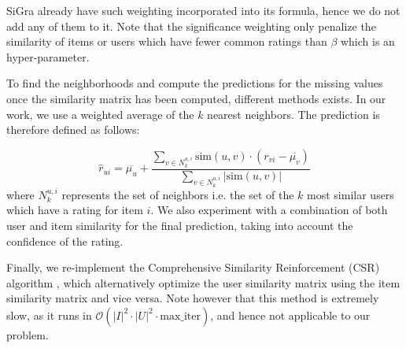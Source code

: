 \documentclass[sigconf]{acmart}
\begin{document}
\vspace*{0.1cm}
\normalsize
\noindent
SiGra already have such weighting incorporated into its formula, hence we do not add any of them to it. 
Note that the significance weighting only penalize the similarity of items or users which have fewer common ratings than $\beta$ which is an hyper-parameter.

To find the neighborhoods and compute the predictions for the missing values once the similarity matrix has been computed, different methods exists. In our work, we use a weighted average of the $k$ nearest neighbors. The prediction is therefore defined as follows:

\small
\begin{equation*}
    \hat{r}_{ui} = \overline{\mu_u} + \frac{\sum_{v\in N_k^{u,i}} \textrm{sim}(u, v) \cdot (r_{vi} - \overline{\mu_v})}{\sum_{v\in N_k^{u,i}} |\textrm{sim}(u, v)|}
\end{equation*}
\normalsize
where $N_k^{u,i}$ represents the set of neighbors i.e. the set of the $k$ most similar users which have a rating for item $i$.
We also experiment with a combination of both user and item similarity for the final prediction, taking into account the confidence of the rating.%

Finally, we re-implement the Comprehensive Similarity Reinforcement (CSR) algorithm \cite{hu2017mitigating}, which alternatively optimize the user similarity matrix using the item similarity matrix and vice versa. 
Note however that this method is extremely slow, as it runs in $\mathcal{O}(|I|^2 \cdot |U|^2 \cdot \textrm{max\_iter})$, and hence not applicable to our problem. 
\end{document}
